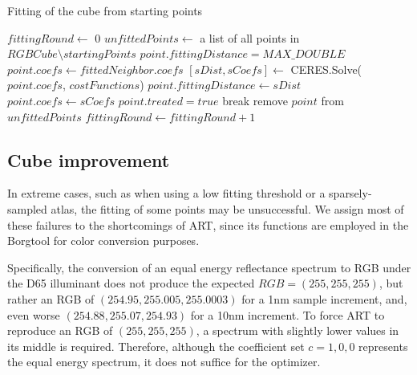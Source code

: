 \begin{algorithm}[t!]
	\caption{Fitting of the cube from starting points}
	\label{alg:upliftingAlgMoments}
	\begin{algorithmic}[1]
		\State $fittingRound \gets$ $0$
		\State $unfittedPoints \gets$ a list of all points in $RGBCube \setminus startingPoints$
		\State $point.fittingDistance = MAX\_DOUBLE$
		\EndFor
		 \label{algStep:coefficientRecomputation}
		\Else
		\State $point.coefs \gets fittedNeighbor.coefs$
		\EndIf 
		\State $[sDist,sCoefs]\gets$ CERES.Solve($point.coefs$, $costFunctions$)
		\State $point.fittingDistance \gets sDist$
		\State $point.coefs \gets sCoefs$
		\EndIf
		\State $point.treated = true$
		\State break
		\EndIf
		\EndFor
		\State remove $point$ from $unfittedPoints$
		\EndIf
		\EndFor	
		\State $fittingRound \gets fittingRound+1$
		\EndWhile
	\end{algorithmic}
\end{algorithm}

\subsection{Cube improvement} \label{ssec:cubeImprovement}

In extreme cases, such as when using a low fitting threshold or a sparsely-sampled atlas, the fitting of some points may be unsuccessful. We assign most of these failures to the shortcomings of ART, since its functions are employed in the Borgtool for color conversion purposes.

Specifically, the conversion of an equal energy reflectance spectrum to RGB under the D65 illuminant does not produce the expected $RGB = (255, 255, 255)$, but rather an RGB of $(254.95, 255.005, 255.0003)$ for a 1nm sample increment, and, even worse $(254.88, 255.07, 254.93)$ for a 10nm increment. To force ART to reproduce an RGB of $(255, 255, 255)$, a spectrum with slightly lower values in its middle is required. Therefore, although the coefficient set $c = {1, 0, 0}$ represents the equal energy spectrum, it does not suffice for the optimizer.


